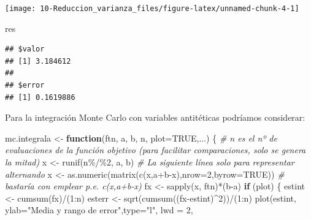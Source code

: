 \documentclass[
]{book}
\newenvironment{Shaded}{\begin{snugshade}}{\end{snugshade}}
\newcommand{\AttributeTok}[1]{\textcolor[rgb]{0.77,0.63,0.00}{#1}}
\newcommand{\CommentTok}[1]{\textcolor[rgb]{0.56,0.35,0.01}{\textit{#1}}}
\newcommand{\ConstantTok}[1]{\textcolor[rgb]{0.00,0.00,0.00}{#1}}
\newcommand{\ControlFlowTok}[1]{\textcolor[rgb]{0.13,0.29,0.53}{\textbf{#1}}}
\newcommand{\DecValTok}[1]{\textcolor[rgb]{0.00,0.00,0.81}{#1}}
\newcommand{\FunctionTok}[1]{\textcolor[rgb]{0.00,0.00,0.00}{#1}}
\newcommand{\NormalTok}[1]{#1}
\newcommand{\OtherTok}[1]{\textcolor[rgb]{0.56,0.35,0.01}{#1}}
\newcommand{\SpecialCharTok}[1]{\textcolor[rgb]{0.00,0.00,0.00}{#1}}
\newcommand{\StringTok}[1]{\textcolor[rgb]{0.31,0.60,0.02}{#1}}
\theoremstyle{break}
\theoremstyle{definition}
\theoremstyle{definition}
\theoremstyle{definition}
\theoremstyle{definition}
\theoremstyle{remark}
\begin{document}
\begin{center}\texttt{[image: 10-Reduccion\_varianza\_files/figure-latex/unnamed-chunk-4-1]} \end{center}

\begin{Shaded}
\begin{Highlighting}[]
\NormalTok{res}
\end{Highlighting}
\end{Shaded}

\begin{verbatim}
## $valor
## [1] 3.184612
## 
## $error
## [1] 0.1619886
\end{verbatim}

Para la integración Monte Carlo con variables antitéticas podríamos considerar:

\begin{Shaded}
\begin{Highlighting}[]
\NormalTok{mc.integrala }\OtherTok{\textless{}{-}} \ControlFlowTok{function}\NormalTok{(ftn, a, b, n, }\AttributeTok{plot=}\ConstantTok{TRUE}\NormalTok{,...) \{}
  \CommentTok{\# n es el nº de evaluaciones de la función objetivo (para facilitar comparaciones, solo se genera la mitad)}
\NormalTok{  x }\OtherTok{\textless{}{-}} \FunctionTok{runif}\NormalTok{(n}\SpecialCharTok{\%/\%}\DecValTok{2}\NormalTok{, a, b)}
  \CommentTok{\# La siguiente línea solo para representar alternando}
\NormalTok{  x }\OtherTok{\textless{}{-}} \FunctionTok{as.numeric}\NormalTok{(}\FunctionTok{matrix}\NormalTok{(}\FunctionTok{c}\NormalTok{(x,a}\SpecialCharTok{+}\NormalTok{b}\SpecialCharTok{{-}}\NormalTok{x),}\AttributeTok{nrow=}\DecValTok{2}\NormalTok{,}\AttributeTok{byrow=}\ConstantTok{TRUE}\NormalTok{))}
  \CommentTok{\# bastaría con emplear p.e. c(x,a+b{-}x)}
\NormalTok{  fx }\OtherTok{\textless{}{-}} \FunctionTok{sapply}\NormalTok{(x, ftn)}\SpecialCharTok{*}\NormalTok{(b}\SpecialCharTok{{-}}\NormalTok{a)}
  \ControlFlowTok{if}\NormalTok{ (plot) \{}
\NormalTok{    estint }\OtherTok{\textless{}{-}} \FunctionTok{cumsum}\NormalTok{(fx)}\SpecialCharTok{/}\NormalTok{(}\DecValTok{1}\SpecialCharTok{:}\NormalTok{n)}
\NormalTok{    esterr }\OtherTok{\textless{}{-}} \FunctionTok{sqrt}\NormalTok{(}\FunctionTok{cumsum}\NormalTok{((fx}\SpecialCharTok{{-}}\NormalTok{estint)}\SpecialCharTok{\^{}}\DecValTok{2}\NormalTok{))}\SpecialCharTok{/}\NormalTok{(}\DecValTok{1}\SpecialCharTok{:}\NormalTok{n)}
    \FunctionTok{plot}\NormalTok{(estint, }\AttributeTok{ylab=}\StringTok{"Media y rango de error"}\NormalTok{,}\AttributeTok{type=}\StringTok{"l"}\NormalTok{, }\AttributeTok{lwd =} \DecValTok{2}\NormalTok{,}

\end{Highlighting}
\end{Shaded}
\end{document}
